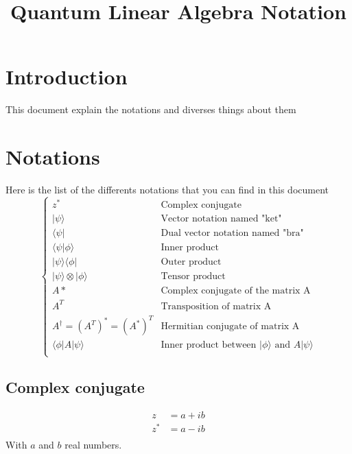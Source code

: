 \documentclass{article}
\begin{document}
\title{Quantum Linear Algebra Notation}
\section{Introduction}

This document explain the notations and diverses things about them

\section{Notations}

Here is the list of the differents notations that you can find in this document
\begin{equation}
    \begin{cases}
        z^* & \text{Complex conjugate} \\
        |\psi\rangle & \text{Vector notation named "ket"} \\
        \langle\psi| & \text{Dual vector notation named "bra"} \\
        \langle\psi|\phi\rangle & \text{Inner product} \\
        |\psi\rangle\langle\phi| & \text{Outer product} \\
        |\psi\rangle\otimes|\phi\rangle & \text{Tensor product} \\
        A* & \text{Complex conjugate of the matrix A} \\
        A^T & \text{Transposition of matrix A} \\
        A^\dag = (A^T)^* = (A^*)^T & \text{Hermitian conjugate of matrix A} \\
        \langle\phi|A|\psi\rangle & \text{Inner product between $|\phi\rangle$ and $A|\psi\rangle$} \\
    \end{cases}
\end{equation}

\subsection{Complex conjugate}

\begin{equation}
    \begin{split}
        z & = a + ib \\
        z^* & = a - ib \\
    \end{split}
\end{equation}
With $a$ and $b$ real numbers.
\end{document}

